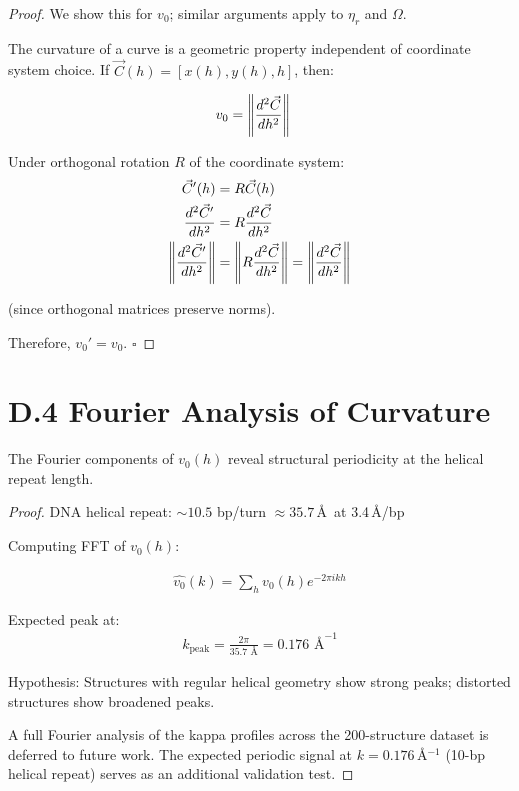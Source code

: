 \begin{proof}
We show this for $v_0$; similar arguments apply to $\eta_r$ and $\Omega$.

The curvature of a curve is a geometric property independent of coordinate system choice. If $\vec{C}(h) = [x(h), y(h), h]$, then:

\begin{align}
    v_0 &= \left\lVert\frac{d^2\vec{C}}{dh^2}\right\rVert
\end{align}

Under orthogonal rotation $R$ of the coordinate system:
\begin{align}
    \vec{C}'(h) &= R \vec{C}(h) \\
    \frac{d^2\vec{C}'}{dh^2} &= R \frac{d^2\vec{C}}{dh^2} \\
    \left\lVert\frac{d^2\vec{C}'}{dh^2}\right\rVert &= \left\lVert R \frac{d^2\vec{C}}{dh^2}\right\rVert = \left\lVert\frac{d^2\vec{C}}{dh^2}\right\rVert
\end{align}

(since orthogonal matrices preserve norms).

Therefore, $v_0' = v_0$. $\square$
\end{proof}

\section{D.4 Fourier Analysis of Curvature}

\begin{theorem}
The Fourier components of $v_0(h)$ reveal structural periodicity at the helical repeat length.
\end{theorem}

\begin{proof}
DNA helical repeat: ${\sim}10.5$ bp/turn $\approx 35.7$\,\AA\ at 3.4\,\AA/bp

Computing FFT of $v_0(h)$:

\begin{align}
    \hat{v_0}(k) = \sum_h v_0(h) e^{-2\pi i k h}
\end{align}

Expected peak at:
\begin{align}
    k_{\text{peak}} = \frac{2\pi}{35.7 \text{ \AA}} = 0.176 \text{ \AA}^{-1}
\end{align}

Hypothesis: Structures with regular helical geometry show strong peaks; distorted structures show broadened peaks.

A full Fourier analysis of the kappa profiles across the 200-structure dataset is deferred to future work. The expected periodic signal at $k = 0.176$\,\AA$^{-1}$ (10-bp helical repeat) serves as an additional validation test.
\end{proof}

